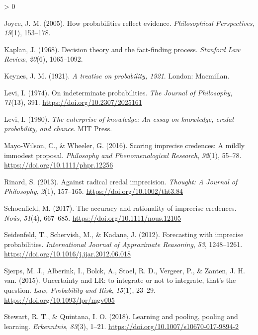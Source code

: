 \documentclass[
  10pt,
  dvipsnames,enabledeprecatedfontcommands]{scrartcl}
\newlength{\cslhangindent}
\newenvironment{CSLReferences}[2] %
 {%
  \setlength{\parindent}{0pt}
  \ifodd #1 \everypar{\setlength{\hangindent}{\cslhangindent}}\ignorespaces\fi
  \ifnum #2 > 0
  \setlength{\parskip}{#2\baselineskip}
  \fi
 }%
 {}
\begin{document}
\begin{CSLReferences}{1}{0}
\leavevmode\hypertarget{ref-joyce2005probabilities}{}%
Joyce, J. M. (2005). How probabilities reflect evidence.
\emph{Philosophical Perspectives}, \emph{19}(1), 153--178.

\leavevmode\hypertarget{ref-Kaplan1968decision}{}%
Kaplan, J. (1968). Decision theory and the fact-finding process.
\emph{Stanford Law Review}, \emph{20}(6), 1065--1092.

\leavevmode\hypertarget{ref-keynes1921treatise}{}%
Keynes, J. M. (1921). \emph{A treatise on probability, 1921}. London:
Macmillan.

\leavevmode\hypertarget{ref-Levi1974ideterminate}{}%
Levi, I. (1974). On indeterminate probabilities. \emph{The Journal of
Philosophy}, \emph{71}(13), 391. \url{https://doi.org/10.2307/2025161}

\leavevmode\hypertarget{ref-Levi1980enterprise}{}%
Levi, I. (1980). \emph{The enterprise of knowledge: An essay on
knowledge, credal probability, and chance}. MIT Press.

\leavevmode\hypertarget{ref-Mayo-Wilson2016scoring}{}%
Mayo-Wilson, C., \& Wheeler, G. (2016). Scoring imprecise credences: A
mildly immodest proposal. \emph{Philosophy and Phenomenological
Research}, \emph{92}(1), 55--78.
\url{https://doi.org/10.1111/phpr.12256}

\leavevmode\hypertarget{ref-Rinard2013against}{}%
Rinard, S. (2013). Against radical credal imprecision. \emph{Thought: A
Journal of Philosophy}, \emph{2}(1), 157--165.
\url{https://doi.org/10.1002/tht3.84}

\leavevmode\hypertarget{ref-Schoenfield2017accuracy}{}%
Schoenfield, M. (2017). The accuracy and rationality of imprecise
credences. \emph{Noûs}, \emph{51}(4), 667--685.
\url{https://doi.org/10.1111/nous.12105}

\leavevmode\hypertarget{ref-seidenfeld2012forecasting}{}%
Seidenfeld, T., Schervish, M., \& Kadane, J. (2012). Forecasting with
imprecise probabilities. \emph{International Journal of Approximate
Reasoning}, \emph{53}, 1248--1261.
\url{https://doi.org/10.1016/j.ijar.2012.06.018}

\leavevmode\hypertarget{ref-Sjerps2015Uncertainty}{}%
Sjerps, M. J., Alberink, I., Bolck, A., Stoel, R. D., Vergeer, P., \&
Zanten, J. H. van. (2015). {Uncertainty and LR: to integrate or not to
integrate, that's the question}. \emph{Law, Probability and Risk},
\emph{15}(1), 23--29. \url{https://doi.org/10.1093/lpr/mgv005}

\leavevmode\hypertarget{ref-Stewart2018pooling}{}%
Stewart, R. T., \& Quintana, I. O. (2018). Learning and pooling, pooling
and learning. \emph{Erkenntnis}, \emph{83}(3), 1--21.
\url{https://doi.org/10.1007/s10670-017-9894-2}


\end{CSLReferences}
\end{document}
